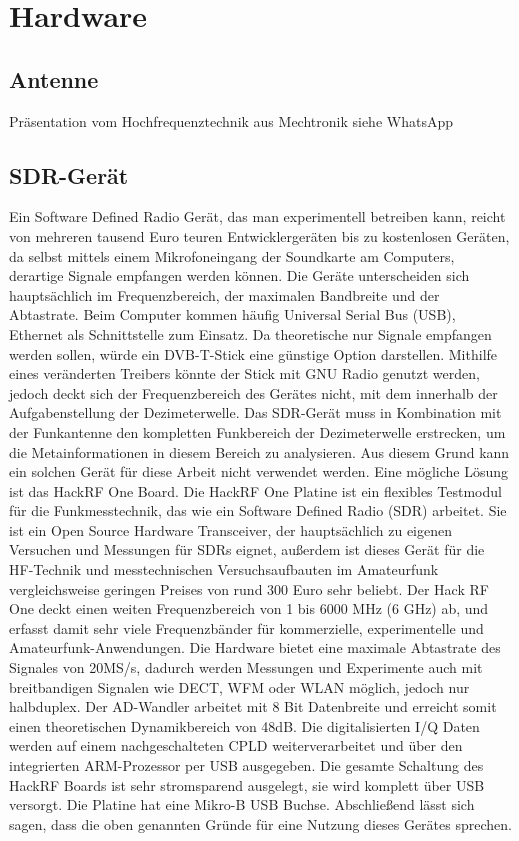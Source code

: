\section{Hardware}
\subsection{Antenne}
Präsentation vom Hochfrequenztechnik aus Mechtronik siehe WhatsApp
\subsection{SDR-Gerät}
Ein Software Defined Radio Gerät, das man experimentell betreiben kann, reicht von mehreren tausend Euro teuren Entwicklergeräten bis zu kostenlosen Geräten, da selbst mittels einem Mikrofoneingang der Soundkarte am Computers, derartige Signale empfangen werden können. Die Geräte unterscheiden sich hauptsächlich im Frequenzbereich, der maximalen Bandbreite und der Abtastrate. Beim Computer kommen häufig Universal Serial Bus (USB), Ethernet als Schnittstelle zum  Einsatz.
Da theoretische nur Signale empfangen werden sollen, würde ein DVB-T-Stick eine günstige Option darstellen. Mithilfe eines veränderten Treibers könnte der Stick mit GNU Radio genutzt werden, jedoch deckt sich der Frequenzbereich des Gerätes nicht, mit dem innerhalb der Aufgabenstellung der Dezimeterwelle.
Das SDR-Gerät muss in Kombination mit der Funkantenne den kompletten Funkbereich der Dezimeterwelle erstrecken, um die Metainformationen in diesem Bereich zu analysieren. Aus diesem Grund kann ein solchen Gerät für diese Arbeit nicht verwendet werden.
Eine mögliche Lösung ist das HackRF One Board. Die HackRF One Platine ist ein flexibles Testmodul für die Funkmesstechnik, das wie ein Software Defined Radio (SDR) arbeitet. Sie ist ein Open Source Hardware Transceiver, der hauptsächlich zu eigenen Versuchen und Messungen für SDRs eignet, außerdem ist dieses Gerät für die HF-Technik und messtechnischen Versuchsaufbauten im Amateurfunk vergleichsweise geringen Preises von rund 300 Euro sehr beliebt.
Der Hack RF One deckt einen weiten Frequenzbereich von 1 bis 6000 MHz (6 GHz) ab, und erfasst damit sehr viele Frequenzbänder für kommerzielle, experimentelle und Amateurfunk-Anwendungen. Die Hardware bietet eine maximale Abtastrate des Signales von 20MS/s, dadurch werden Messungen und Experimente auch mit breitbandigen Signalen wie DECT, WFM oder WLAN möglich, jedoch nur halbduplex. Der AD-Wandler arbeitet mit 8 Bit Datenbreite und erreicht somit einen theoretischen Dynamikbereich von 48dB. Die digitalisierten I/Q Daten werden auf einem nachgeschalteten CPLD weiterverarbeitet und über den integrierten ARM-Prozessor per USB ausgegeben. Die gesamte Schaltung des HackRF Boards ist sehr stromsparend ausgelegt, sie wird komplett über USB versorgt. Die Platine hat eine Mikro-B USB Buchse. Abschließend lässt sich sagen, dass die oben genannten Gründe für eine Nutzung dieses Gerätes sprechen.
